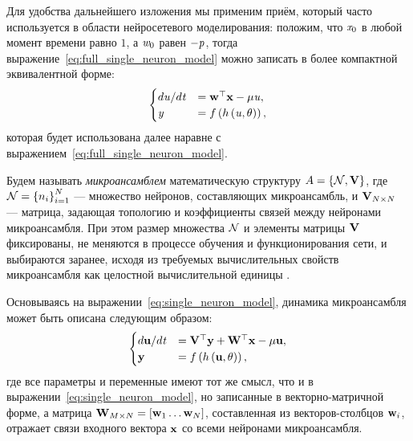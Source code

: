 
Для удобства дальнейшего изложения мы применим приём, который часто используется в области нейросетевого моделирования: положим, что $\vectoritem{x}{0}$ в любой момент времени равно $1$, а $\vectoritem{w}{0}$ равен $-\mathit{p}$, тогда выражение~\eqref{eq:full_single_neuron_model} можно записать в более компактной эквивалентной форме:
\begin{equation}
    \label{eq:single_neuron_model}
    \begin{cases}
        d\mathit{u} / d\mathit{t}   &=  \mathrm{\mathbf{w}}^{\top} \mathrm{\mathbf{x}} - \mu \mathit{u}, \\
        \mathit{y}                  &=  f\left( h\left( \mathit{u}, \theta \right) \right), \\
    \end{cases}
\end{equation}
которая будет использована далее наравне с выражением~\eqref{eq:full_single_neuron_model}.

\begin{Definition}
    Будем называть \textit{микроансамблем} математическую структуру $A = \left\{ \mathcal{N}, \mathrm{\mathbf{V}} \right\}$, где $\mathcal{N} = \left\{ n_{i} \right\}_{i=1}^{N} $ --- множество нейронов, составляющих микроансамбль, и $\mathrm{\mathbf{V}}_{N \times N}$ --- матрица, задающая топологию и коэффициенты связей между нейронами микроансамбля. При этом размер множества $\mathcal{N}$ и элементы матрицы $\mathrm{\mathbf{V}}$ фиксированы, \ie не меняются в процессе обучения и функционирования сети, и выбираются заранее, исходя из требуемых вычислительных свойств микроансамбля как целостной вычислительной единицы .
\end{Definition}

Основываясь на выражении~\eqref{eq:single_neuron_model}, динамика микроансамбля может быть описана следующим образом:
\begin{equation}
    \label{eq:microensemble_model}
    \begin{cases}
        d\mathrm{\mathbf{u}}/d\mathit{t} &= \mathrm{\mathbf{V}}^{\top} \mathrm{\mathbf{y}} + \mathrm{\mathbf{W}}^{\top} \mathrm{\mathbf{x}} - \mu \mathrm{\mathbf{u}}, \\
        \mathrm{\mathbf{y}}              &= f\left( h\left( \mathrm{\mathbf{u}}, \theta \right) \right), \\
    \end{cases}
\end{equation}
где все параметры и переменные имеют тот же смысл, что и в выражении~\eqref{eq:single_neuron_model}, но записанные в векторно-матричной форме, а матрица $\mathrm{\mathbf{W}}_{M \times N} = \left[ \mathrm{\mathbf{w}}_{1} \ldots \mathrm{\mathbf{w}}_{N} \right]$, составленная из векторов-столбцов $\mathrm{\mathbf{w}}_{i}$, отражает связи входного вектора $\mathrm{\mathbf{x}}$ со всеми нейронами микроансамбля.

